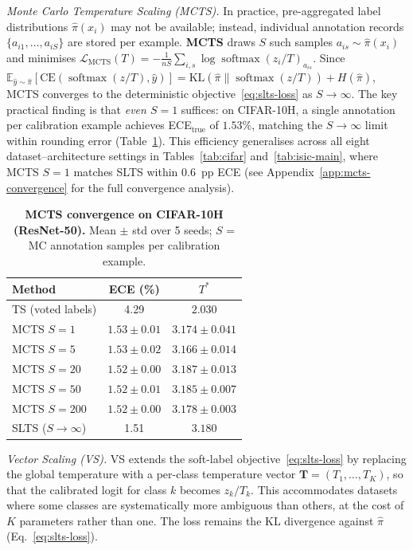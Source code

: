 \documentclass[10pt,journal,compsoc]{IEEEtran}
\newcommand{\pihat}{\hat{\pi}}
\newcommand{\bE}{\mathbb{E}}
\newcommand{\KL}{\mathrm{KL}}
\begin{document}
\noindent\textit{Monte Carlo Temperature Scaling (MCTS).}
In practice, pre-aggregated label distributions $\pihat(x_i)$ may not be available; instead, individual annotation records $\{a_{i1},\ldots,a_{iS}\}$ are stored per example.  \textbf{MCTS} draws $S$ such samples $a_{is}\sim\pihat(x_i)$ and minimises
$\mathcal{L}_{\text{MCTS}}(T) = -\frac{1}{nS}\sum_{i,s} \log\operatorname{softmax}(z_i/T)_{a_{is}}$.
Since $\bE_{\hat{y}\sim\pihat}[\mathrm{CE}(\operatorname{softmax}(z/T),\hat{y})] = \KL(\pihat\|\operatorname{softmax}(z/T)) + H(\pihat)$, MCTS converges to the deterministic objective~\eqref{eq:slts-loss} as $S\to\infty$.
The key practical finding is that \emph{even $S=1$} suffices: on CIFAR-10H, a single annotation per calibration example achieves ECE$_\text{true}$ of $1.53\%$, matching the $S\!\to\!\infty$ limit within rounding error (Table~\ref{tab:mcts}).
This efficiency generalises across all eight dataset--architecture settings in Tables~\ref{tab:cifar} and~\ref{tab:isic-main}, where MCTS $S{=}1$ matches SLTS within 0.6~pp ECE (see Appendix~\ref{app:mcts-convergence} for the full convergence analysis).

\begin{table}[t]
  \centering
  \caption{
    \textbf{MCTS convergence on CIFAR-10H (ResNet-50).}  Mean $\pm$ std over 5 seeds; $S$ = MC annotation samples per calibration example.
  }
  \label{tab:mcts}
  \small
  \setlength{\tabcolsep}{6pt}
  \begin{tabular}{lcc}
    \toprule
    Method & ECE (\%) & $T^*$ \\
    \midrule
    TS (voted labels)   & 4.29          & $2.030$            \\
    \midrule
    MCTS $S=1$          & $1.53\pm0.01$ & $3.174\pm0.041$ \\
    MCTS $S=5$          & $1.53\pm0.02$ & $3.166\pm0.014$ \\
    MCTS $S=20$         & $1.52\pm0.00$ & $3.187\pm0.013$ \\
    MCTS $S=50$         & $1.52\pm0.01$ & $3.185\pm0.007$ \\
    MCTS $S=200$        & $1.52\pm0.00$ & $3.178\pm0.003$ \\
    SLTS ($S\to\infty$) & 1.51          & $3.180$            \\
    \bottomrule
  \end{tabular}
\end{table}

\noindent\textit{Vector Scaling (VS).}
VS extends the soft-label objective~\eqref{eq:slts-loss} by replacing the global temperature with a per-class temperature vector $\mathbf{T}=(T_1,\ldots,T_K)$, so that the calibrated logit for class $k$ becomes $z_k/T_k$.  This accommodates datasets where some classes are systematically more ambiguous than others, at the cost of $K$ parameters rather than one.  The loss remains the KL divergence against $\pihat$ (Eq.~\ref{eq:slts-loss}).
\end{document}
